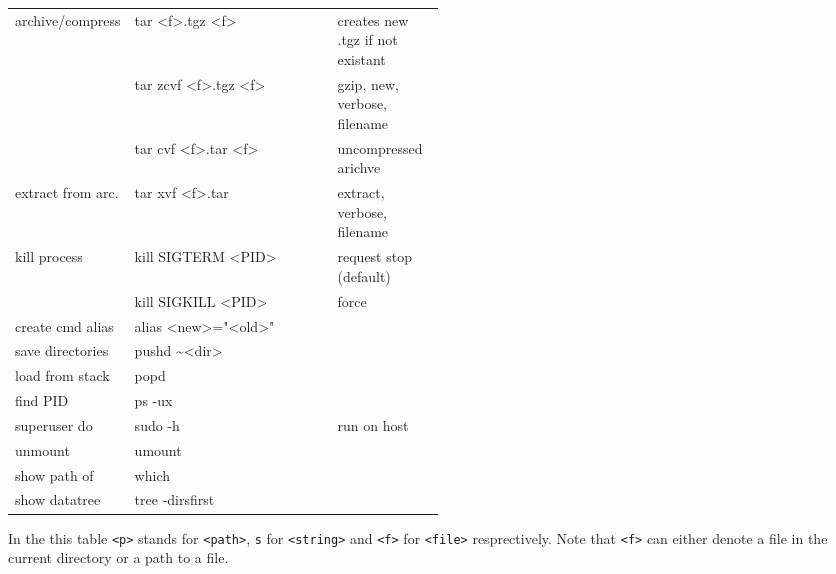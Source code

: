 {\begin{tabularx}{\linewidth}{@{} p{0.25\linewidth}>{\ttfamily}lp{0.25\linewidth} @{}}
        archive/compress  & tar <f>.tgz <f>            & creates new .tgz if not existant \\
                          & tar zcvf <f>.tgz <f>       & gzip, new, verbose, filename     \\
                          & tar cvf <f>.tar <f>        & uncompressed arichve             \\
        extract from arc. & tar xvf <f>.tar            & extract, verbose, filename       \\
        kill process      & kill SIGTERM <PID>         & request stop (default)           \\
                          & kill SIGKILL <PID>         & force                            \\
        create cmd alias  & alias <new>="<old>"        &                                  \\
        save directories  & pushd \textasciitilde<dir> &                                  \\
        load from stack   & popd                       &                                  \\
        find PID          & ps -ux                     &                                  \\
        superuser do      & sudo -h                    & run on host                      \\
        unmount           & umount                     &                                  \\
        show path of      & which                      &                                  \\
        show datatree     & tree -dirsfirst            &                                  \\
        \bottomrule
    \end{tabularx}
} %
\renewcommand{\arraystretch}{1}
\setlength\tabcolsep{6pt} %
In the this table \texttt{<p>} stands for \texttt{<path>}, \texttt{s} for \texttt{<string>} and \texttt{<f>} for \texttt{<file>} resprectively. Note that \texttt{<f>} can either denote a file in the current directory or a path to a file.\\



